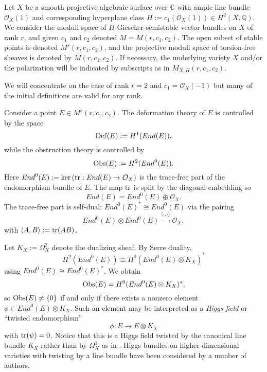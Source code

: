 \documentclass{amsart}
\theoremstyle{plain}
\numberwithin{equation}{section}
\begin{document}
Let $X$ be a smooth projective algebraic surface over ${{\mathbb C}}$ 
with ample line bundle ${{\mathcal O}} _X(1)$ 
and corresponding hyperplane class $H:= c_1({{\mathcal O}} _X(1))\in H^2(X,{{\mathbb Q}} )$. We consider the
moduli space of $H$-Gieseker-semistable 
vector bundles on $X$ of rank $r$, and given $c_1$ and
$c_2$ denoted $M = M (r,c_1,c_2)$. The open subset of stable points is denoted
$M^s(r,c_1,c_2)$, and the projective moduli space of torsion-free sheaves is denoted
by $\overline{M } (r,c_1,c_2)$. If necessary, the underlying variety $X$ and/or the polarization will be indicated by subscripts as in $M_{X,H}(r,c_1,c_2)$. 

We will concentrate on the case of rank $r=2$ and $c_1={{\mathcal O}} _X(-1)$
but many of the initial definitions
are valid for any rank. 

Consider a point $E\in M^s(r,c_1,c_2)$. The deformation theory of $E$ is
controlled by the space 
$$
{{\rm Def}} (E):= H^1({{\mathit End}} (E)),
$$
while the obstruction theory is controlled by 
$$
{{\rm Obs}} (E) := H^2({{\mathit End}} ^0(E)).
$$
Here ${{\mathit End}} ^0(E):= \ker \left( {{\rm tr}} : {{\mathit End}} (E)\rightarrow {{\mathcal O}} _X\right) $
is the trace-free part of the endomorphism bundle of $E$. The map ${{\rm tr}}$ is split
by the diagonal embedding so 
$$
{{\mathit End}} (E)={{\mathit End}} ^0(E) \oplus {{\mathcal O}} _X.
$$
The trace-free part is self-dual: ${{\mathit End}} ^0(E)^{\ast}\cong {{\mathit End}} ^0(E)$
via the pairing
$$
{{\mathit End}} ^0(E)\otimes {{\mathit End}} ^0(E)\stackrel{\langle \cdot , \cdot \rangle}{\longrightarrow} 
{{\mathcal O}} _X,
$$
with $\langle A , B \rangle := {{\rm tr}} (AB)$.

Let $K_X:= \Omega ^2_X$ denote the dualizing sheaf. By Serre duality,
$$
H^2({{\mathit End}} ^0(E))\cong H^0({{\mathit End}} ^0(E)\otimes K_X)^{\ast}
$$
using ${{\mathit End}} ^0(E)\cong {{\mathit End}} ^0(E)^{\ast}$. We obtain
$$
{{\rm Obs}} (E)= H^0({{\mathit End}} ^0(E)\otimes K_X)^{\ast},
$$
so ${{\rm Obs}} (E)\neq \{ 0 \}$ if and only if there exists a nonzero element 
$\phi \in {{\mathit End}} ^0(E)\otimes K_X$. Such an element may be interpreted as a {\em Higgs field}
\cite{Hitchin} or ``twisted endomorphism''
$$
\phi : E\rightarrow E\otimes K_X
$$
with ${{\rm tr}} (\psi )=0$. Notice that this is a Higgs field twisted by the canonical line bundle
$K_X$ rather than by $\Omega ^1_X$ as in \cite{hbls}. Higgs bundles on higher 
dimensional varieties with twisting by
a line bundle have been considered by a number of authors. 
\end{document}
